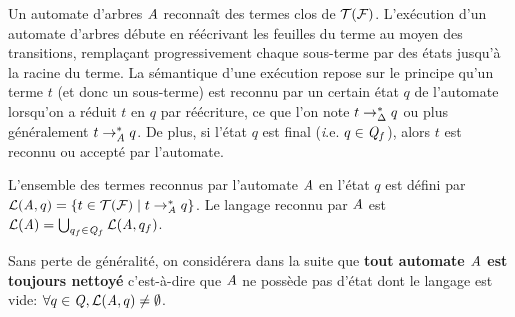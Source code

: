Un automate d'arbres $\mathit A$ reconnaît des termes clos de $\mathcal{T(F)}$. L'exécution d'un automate d'arbres
débute en réécrivant les feuilles du terme au moyen des transitions, remplaçant progressivement
chaque sous-terme par des états jusqu'à la racine du terme. La sémantique d'une exécution 
repose sur le principe qu'un terme $t$ (et donc un sous-terme) est reconnu par un certain état $q$ de l'automate lorsqu'on a
réduit $t$ en $q$ par réécriture, ce que l'on note $t \rightarrow_\Delta^* q$ ou plus généralement $t \rightarrow_\mathit A^* q$. De plus, si l'état $q$
est final (\textit i.e. $q \in \mathit Q_f$), alors $t$ est reconnu ou accepté par l'automate.

\begin{definition}
  L'ensemble des termes reconnus par l'automate $\mathit A$ en l'état $q$ est défini par $\mathcal{L}(\mathit A, q) = \{ t \in \mathcal{T(F)} \; | \; t \rightarrow_\mathit A^* q\}$.
  Le langage reconnu par $\mathit A$ est $\mathcal{L}(\mathit A) = \bigcup_{q_f\in \mathit Q_f} \mathcal{L}(\mathit A, q_f)$. 
\end{definition}
Sans perte de généralité, on considérera dans la suite que \textbf{tout automate $\mathit A$ est toujours nettoyé}
c'est-à-dire que $\mathit A$ ne possède pas d'état dont le langage est vide: $\forall q \in \mathit Q, \mathcal{L}(\mathit A, q) \not= \emptyset$.

